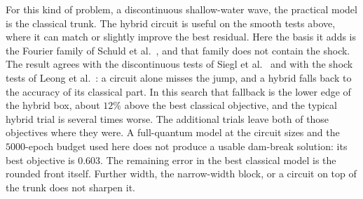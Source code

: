 \documentclass[11pt]{article}
\begin{document}
For this kind of problem, a discontinuous shallow-water wave, the practical model is the classical trunk. The hybrid circuit is useful on the smooth tests above, where it can match or slightly improve the best residual. Here the basis it adds is the Fourier family of Schuld et al.~\cite{schuld2021}, and that family does not contain the shock. The result agrees with the discontinuous tests of Siegl et al.~\cite{siegl2024} and with the shock tests of Leong et al.~\cite{leong2025}: a circuit alone misses the jump, and a hybrid falls back to the accuracy of its classical part. In this search that fallback is the lower edge of the hybrid box, about \(12\%\) above the best classical objective, and the typical hybrid trial is several times worse. The additional trials leave both of those objectives where they were. A full-quantum model at the circuit sizes and the \(5000\)-epoch budget used here does not produce a usable dam-break solution: its best objective is \(0.603\). The remaining error in the best classical model is the rounded front itself. Further width, the narrow-width block, or a circuit on top of the trunk does not sharpen it.
\end{document}
